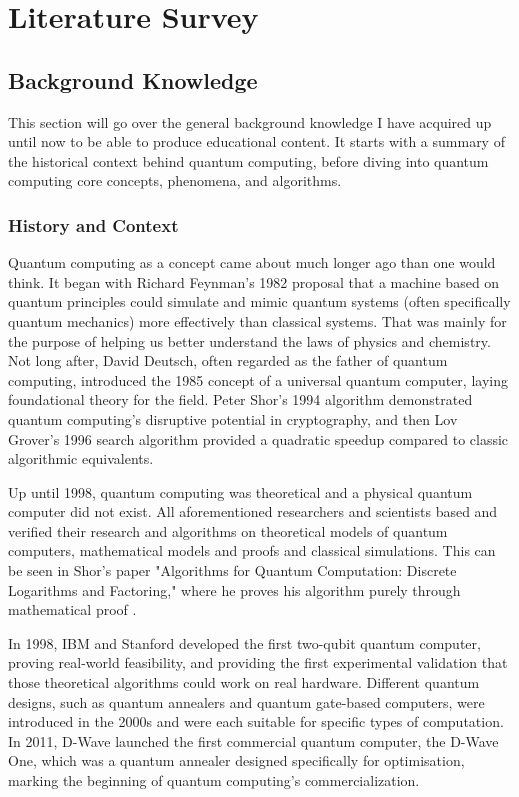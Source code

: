 \chapter{Literature Survey}

\section{Background Knowledge}

This section will go over the general background knowledge I have acquired up until now to be able to produce educational content. It starts with a summary of the historical context behind quantum computing, before diving into quantum computing core concepts, phenomena, and algorithms.  

\subsection{ History and Context }

Quantum computing as a concept came about much longer ago than one would think. It began with Richard Feynman’s 1982 proposal that a machine based on quantum principles could simulate and mimic quantum systems (often specifically quantum mechanics) more effectively than classical systems\cite{Refrence2}. That was mainly for the purpose of helping us better understand the laws of physics and chemistry. Not long after, David Deutsch, often regarded as the father of quantum computing, introduced the 1985 concept of a universal quantum computer, laying foundational theory for the field. Peter Shor's 1994 algorithm demonstrated quantum computing's disruptive potential in cryptography, and then Lov Grover’s 1996 search algorithm provided a quadratic speedup compared to classic algorithmic equivalents.\newline

Up until 1998, quantum computing was theoretical and a physical quantum computer did not exist. All aforementioned researchers and scientists based and verified their research and algorithms on theoretical models of quantum computers, mathematical models and proofs and classical simulations.  This can be seen in Shor's paper "Algorithms for Quantum Computation: Discrete Logarithms and Factoring," where he proves his algorithm purely through mathematical proof \cite{Reference3}. \newline

In 1998, IBM and Stanford developed the first two-qubit quantum computer, proving real-world feasibility, and  providing the first experimental validation that those theoretical algorithms could work on real hardware. Different quantum designs, such as quantum annealers and quantum gate-based computers, were introduced in the 2000s and were each suitable for specific types of computation. In 2011, D-Wave launched the first commercial quantum computer, the D-Wave One, which was a quantum annealer designed specifically for optimisation, marking the beginning of quantum computing's commercialization. \newline 

